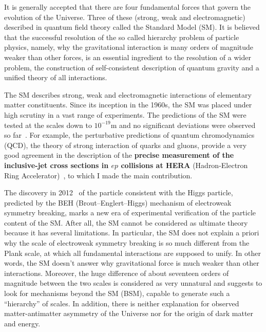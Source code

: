 \textcolor{\mycolor}{
It is generally accepted that there are four fundamental forces that govern the evolution of the Universe. \textcolor{\mynew}{Three of these (strong, weak and electromagnetic) described in quantum field theory called the Standard Model (SM).} It is believed that the successful resolution of the so called hierarchy problem of particle physics, namely, why the gravitational interaction is many orders of magnitude weaker than other forces, is an essential ingredient to the resolution of a wider problem, the construction of self-consistent description of quantum gravity and a unified theory of all interactions.}

\textcolor{\mycolor}{
The SM describes strong, weak and electromagnetic interactions of elementary matter constituents. Since its inception in the 1960s, the SM was placed under high scrutiny in a vast range of experiments. The predictions of the SM were tested at the scales down to $10^{-19}$m and no significant deviations were observed so far~\cite{Agashe:2014kda}. For example, the perturbative predictions of quantum chromodynamics (QCD), the theory of strong interaction of quarks and gluons, provide a very good agreement in the description of the \textbf{precise measurement of the inclusive-jet cross sections in $ep$ collisions at HERA} (Hadron-Electron Ring Accelerator)~\cite{Abramowicz:2012jz}, to which I made the main contribution.}

\textcolor{\mycolor}{
The discovery in 2012~\cite{Aad:2012tfa,Chatrchyan:2012xdj} of the particle consistent with the Higgs particle, predicted by the BEH (Brout--Englert--Higgs) mechanism of electroweak symmetry breaking, marks a new era of experimental verification of the particle content of the SM. After all, the SM cannot be considered as ultimate theory because it has several limitations. In particular, the SM does not explain a priori why the scale of electroweak symmetry breaking is so much different from the Plank scale, at which all fundamental interactions are supposed to unify. In other words, the SM doesn't answer why gravitational force is much weaker than other interactions. Moreover, the huge difference of about seventeen orders of magnitude between the two scales is considered as very unnatural and suggests to look for mechanisms beyond the SM (BSM), capable to generate such a ``hierarchy'' of scales. In addition, there is neither explanation for observed matter-antimatter asymmetry of the Universe nor for the origin of dark matter and energy.}


